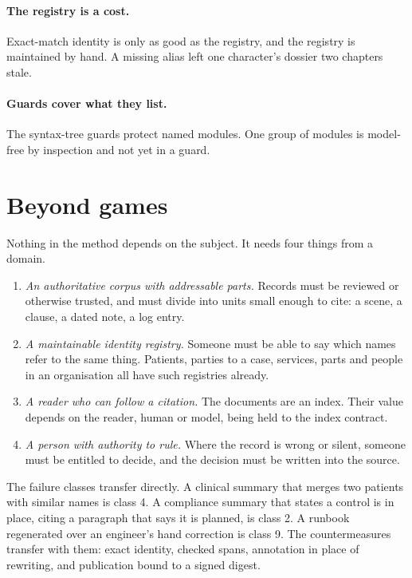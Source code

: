 \documentclass[11pt]{article}
\begin{document}
\paragraph{The registry is a cost.} Exact-match identity is only as good as the
registry, and the registry is maintained by hand. A missing alias left one character's
dossier two chapters stale.

\paragraph{Guards cover what they list.} The syntax-tree guards protect named modules.
One group of modules is model-free by inspection and not yet in a guard.

\section{Beyond games}

Nothing in the method depends on the subject. It needs four things from a domain.

\begin{enumerate}[nosep]
\item \emph{An authoritative corpus with addressable parts.} Records must be reviewed
or otherwise trusted, and must divide into units small enough to cite: a scene, a
clause, a dated note, a log entry.
\item \emph{A maintainable identity registry.} Someone must be able to say which names
refer to the same thing. Patients, parties to a case, services, parts and people in an
organisation all have such registries already.
\item \emph{A reader who can follow a citation.} The documents are an index. Their value
depends on the reader, human or model, being held to the index contract.
\item \emph{A person with authority to rule.} Where the record is wrong or silent,
someone must be entitled to decide, and the decision must be written into the source.
\end{enumerate}

The failure classes transfer directly. A clinical summary that merges two patients with
similar names is class 4. A compliance summary that states a control is in place, citing
a paragraph that says it is planned, is class 2. A runbook regenerated over an
engineer's hand correction is class 9. The countermeasures transfer with them: exact
identity, checked spans, annotation in place of rewriting, and publication bound to a
signed digest.
\end{document}
